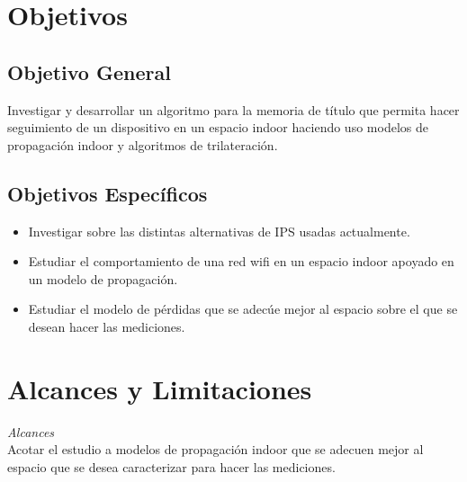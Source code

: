 \section{Objetivos}
\subsection{Objetivo General}

Investigar y desarrollar un algoritmo para la memoria de título que permita hacer seguimiento de un dispositivo en un espacio indoor haciendo uso modelos de propagación indoor y algoritmos de trilateración.

\subsection{Objetivos Específicos}
\begin{itemize}
 \item {Investigar sobre las distintas alternativas de \ac{IPS} usadas actualmente.}
\item{Estudiar el comportamiento de una red wifi en un espacio indoor apoyado en un modelo de propagación.}
 \item {Estudiar el modelo de pérdidas que se adecúe mejor al espacio sobre el que se desean hacer las mediciones.}
\end{itemize}

\section{Alcances y Limitaciones}
\textit{Alcances}\\

Acotar el estudio a modelos de propagación indoor que se adecuen mejor al espacio que se desea caracterizar para hacer las mediciones.\\

